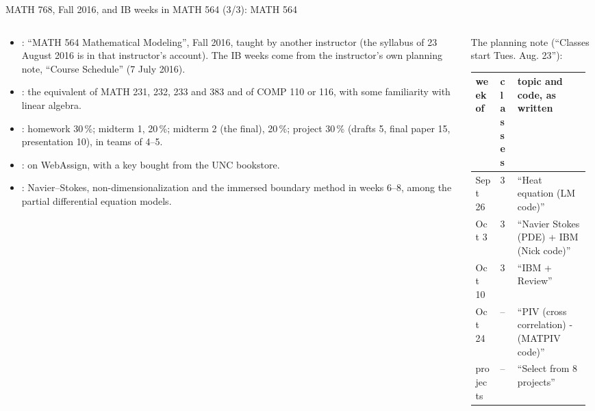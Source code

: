 \documentclass[aspectratio=169,11pt]{beamer}
\begin{document}
\begin{frame}{MATH 768, Fall 2016, and IB weeks in MATH 564 (3/3): MATH 564}
\label{fr:m564}
\begin{columns}[T,onlytextwidth]
\begin{column}{0.48\textwidth}
\scriptsize
\begin{itemize}\setlength{\itemsep}{2pt}
  \item {}: ``MATH 564 Mathematical Modeling'', Fall 2016, taught by another instructor (the syllabus of 23 August 2016 is in that instructor's account). The IB weeks come from the instructor's own planning note, ``Course Schedule'' (7 July 2016).
  \item {}: the equivalent of MATH 231, 232, 233 and 383 and of COMP 110 or 116, with some familiarity with linear algebra.
  \item {}: homework 30\,\%; midterm 1, 20\,\%; midterm 2 (the final), 20\,\%; project 30\,\% (drafts 5, final paper 15, presentation 10), in teams of 4--5.
  \item {}: on WebAssign, with a key bought from the UNC bookstore.
  \item {}: Navier--Stokes, non-dimensionalization and the immersed boundary method in weeks 6--8, among the partial differential equation models.
\end{itemize}
\end{column}
\begin{column}{0.49\textwidth}
\scriptsize
The planning note (``Classes start Tues. Aug. 23''):

\vspace{1mm}
\renewcommand{\arraystretch}{1.05}
\setlength{\tabcolsep}{3pt}
\begin{tabular}{@{}L{0.2\linewidth}L{0.14\linewidth}L{0.59\linewidth}@{}}
\toprule
week of & classes & topic and code, as written \\
\midrule
Sept 26 & 3 & ``Heat equation (LM code)'' \\
Oct 3 & 3 & ``Navier Stokes (PDE) + IBM (Nick code)'' \\
Oct 10 & 3 & ``IBM + Review'' \\
Oct 24 & -- & ``PIV (cross correlation) - (MATPIV code)'' \\
projects & -- & ``Select from 8 projects'' \\
\bottomrule
\end{tabular}


\end{column}
\end{columns}
\end{frame}
\end{document}
